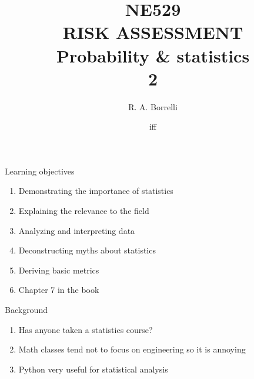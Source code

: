 \documentclass[aspectratio=1610,pdftex,dvipsnames,compress,xcolor={dvipsnames}]{beamer}
\title[NE529 -- Risk Assessment]{NE529\\RISK ASSESSMENT\\Probability \& statistics\\2}
\author[@TheDoctorRAB]{R. A. Borrelli}
\institute[]{
    \acl{ui}\\
    \vspace{0.10in}
    }
\date{\acl{iff}}
\begin{document}
\nobibliography* %


{
    \begin{frame}[plain]{}
        \titlepage
    \end{frame}
}


\begin{frame}{Learning objectives}
    \begin{enumerate}[series=outerlist,topsep=0pt,itemsep=15pt,leftmargin=*,label=(\arabic*)]
        \item[]Demonstrating the importance of statistics
        \item[]Explaining the relevance to the field  
        \item[]Analyzing and interpreting data  
        \item[]Deconstructing myths about statistics  
        \item[]Deriving basic metrics
        \item[]Chapter 7 in the book
    \end{enumerate}
\end{frame}


\begin{frame}{Background}
    \begin{enumerate}[series=outerlist,topsep=0pt,itemsep=21pt,leftmargin=*,label=(\arabic*)]
        \item[]Has anyone taken a statistics course?
        \item[]Math classes tend not to focus on engineering so it is annoying
        \item[]Python very useful for statistical analysis
    \end{enumerate}
\end{frame}
\end{document}
